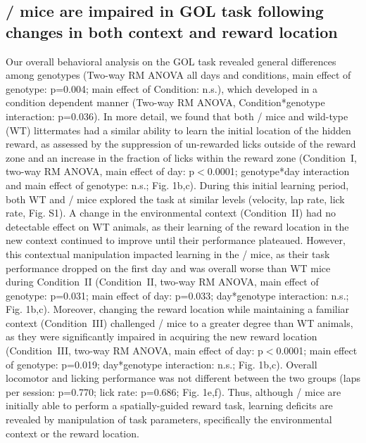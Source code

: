 \subsection{\df/ mice are impaired in GOL task following changes in both context and reward location}

Our overall behavioral analysis on the GOL task revealed general differences among genotypes (Two-way RM ANOVA all days and conditions, main effect of genotype: p=0.004; main effect of Condition: n.s.), which developed in a condition dependent manner (Two-way RM ANOVA, Condition*genotype interaction: p=0.036). In more detail, we found that both \df/ mice and wild-type (WT) littermates had a similar ability to learn the initial location of the hidden reward, as assessed by the suppression of un-rewarded licks outside of the reward zone and an increase in the fraction of licks within the reward zone (Condition~I, two-way RM ANOVA, main effect of day: p$<$0.0001; genotype*day interaction and main effect of genotype: n.s.; Fig. 1b,c). During this initial learning period, both WT and \df/ mice explored the task at similar levels (velocity, lap rate, lick rate, Fig. S1). A change in the environmental context (Condition~II) had no detectable effect on WT animals, as their learning of the reward location in the new context continued to improve until their performance plateaued. However, this contextual manipulation impacted learning in the \df/ mice, as their task performance dropped on the first day and was overall worse than WT mice during Condition~II (Condition~II, two-way RM ANOVA, main effect of genotype: p=0.031; main effect of day: p=0.033; day*genotype interaction: n.s.; Fig. 1b,c). Moreover, changing the reward location while maintaining a familiar context (Condition~III) challenged \df/ mice to a greater degree than WT animals, as they were significantly impaired in acquiring the new reward location (Condition~III, two-way RM ANOVA, main effect of day: p$<$0.0001; main effect of genotype: p=0.019; day*genotype interaction: n.s.; Fig. 1b,c). Overall locomotor and licking performance was not different between the two groups (laps per session: p=0.770; lick rate: p=0.686; Fig. 1e,f). Thus, although \df/ mice are initially able to perform a spatially-guided reward task, learning deficits are revealed by manipulation of task parameters, specifically the environmental context or the reward location.

